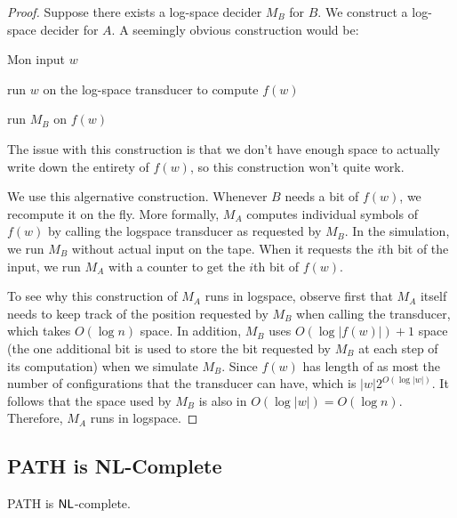 \begin{proof}
    Suppose there exists a log-space decider $M_B$ for $B$. We construct a log-space decider for $A$. A seemingly obvious construction would be:

    \begin{turing}{M}{on input $w$}
        \item run $w$ on the log-space transducer to compute $f(w)$ 
        \item run $M_B$ on $f(w)$ 
    \end{turing}

    The issue with this construction is that we don't have enough space to actually write down the entirety of $f(w)$, so this construction won't quite work.

    We use this algernative construction. Whenever $B$ needs a bit of $f(w)$, we recompute it on the fly. More formally, $M_A$ computes individual symbols of $f(w)$ by calling the logspace transducer as requested by $M_B$. In the simulation, we run $M_B$ without actual input on the tape. When it requests the $i$th bit of the input, we run $M_A$ with a counter to get the $i$th bit of $f(w)$.

    To see why this construction of $M_A$ runs in logspace, observe first that $M_A$ itself needs to keep track of the position requested by $M_B$ when calling the transducer, which takes $O(\log n)$ space. In addition, $M_B$ uses $O(\log |f(w)|) + 1$ space (the one additional bit is used to store the bit requested by $M_B$ at each step of its computation) when we simulate $M_B$. Since $f(w)$ has length of as most the number of configurations that the transducer can have, which is $|w| 2^{O(\log |w|)}$. It follows that the space used by $M_B$ is also in $O(\log |w|) = O(\log n)$. Therefore, $M_A$ runs in logspace.
\end{proof}

\subsection{PATH is NL-Complete}

\vspace{\parskip}

\begin{theorem}
    PATH is $\mathsf{NL}$-complete.
\end{theorem}


